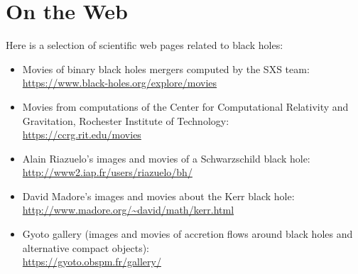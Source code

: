 \chapter{On the Web} \label{s:web}

\minitoc

Here is a selection of scientific web pages related to black holes:

\begin{itemize}
\item Movies of binary black holes mergers computed by the SXS team:\\
\url{https://www.black-holes.org/explore/movies}
\item Movies from computations of the Center for Computational Relativity
and Gravitation, Rochester Institute of Technology:\\
\url{https://ccrg.rit.edu/movies}
\item Alain Riazuelo's images and movies of a Schwarzschild black hole:\\
\url{http://www2.iap.fr/users/riazuelo/bh/}
\item David Madore's images and movies about the Kerr black hole:\\
\url{http://www.madore.org/~david/math/kerr.html}
\item Gyoto gallery (images and movies of accretion flows around black holes and alternative
compact objects): \\
\url{https://gyoto.obspm.fr/gallery/}
\end{itemize}

